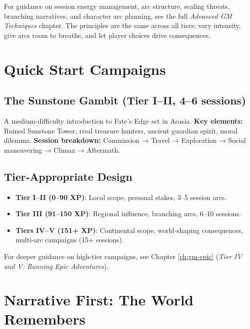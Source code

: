 For guidance on session energy management, arc structure, scaling threats, branching narratives, and character arc planning, see the full \textit{Advanced GM Techniques} chapter. The principles are the same across all tiers: vary intensity, give arcs room to breathe, and let player choices drive consequences.

\section{Quick Start Campaigns}
\label{sec:quick-start-campaigns}

\subsection{The Sunstone Gambit (Tier I–II, 4–6 sessions)}
A medium‑difficulty introduction to Fate’s Edge set in Acasia.  
\textbf{Key elements:} Ruined Sunstone Tower, rival treasure hunters, ancient guardian spirit, moral dilemma.  
\textbf{Session breakdown:} Commission → Travel → Exploration → Social maneuvering → Climax → Aftermath.

\subsection{Tier‑Appropriate Design}
\label{subsec:tier-design}
\begin{itemize}
  \item \textbf{Tier I–II (0–90 XP)}: Local scope, personal stakes, 3–5 session arcs.
  \item \textbf{Tier III (91–150 XP)}: Regional influence, branching arcs, 6–10 sessions.
  \item \textbf{Tiers IV–V (151+ XP)}: Continental scope, world‑shaping consequences, multi‑arc campaigns (15+ sessions).
\end{itemize}
For deeper guidance on high‑tier campaigns, see Chapter \ref{ch:gm-epic} (\textit{Tier IV and V: Running Epic Adventures}).

\section{Narrative First: The World Remembers}
\label{sec:narrative-first}

